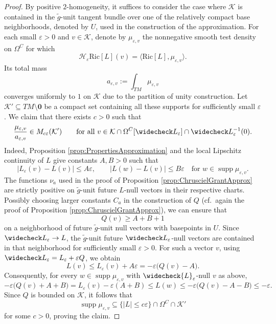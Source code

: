 \documentclass[a4paper,11pt]{article}
\numberwithin{equation}{section}
\theoremstyle{definition}
\theoremstyle{plain}
\newcommand{\eps}{\varepsilon}
\newcommand{\Ric}{\mathrm{Ric}}
\begin{document}
\begin{proof}
By positive $2$-homogeneity, it suffices to consider the case where $\mathcal K$ is contained in the $\tilde g$-unit tangent bundle over one of the relatively compact base neighborhoods, denoted by $U$, used in the construction of the approximation. 
For each small $\varepsilon>0$ and $v\in \mathcal K$, denote by $\mu_{\varepsilon,v}$ the nonnegative smooth test density on $\Omega^C$ for which
\[
    \mathcal H_\eps\Ric[L](v)
    =
    \langle\Ric[L],\mu_{\varepsilon,v}\rangle.
\]
Its total mass
\[
    a_{\varepsilon,v}:=\int_{TM}\mu_{\varepsilon,v}
\]
converges uniformly to $1$ on $\mathcal K$ due to the partition of unity construction.
Let $\mathcal K'\subseteq TM\setminus \mathbf 0$ be a compact set containing all these supports for sufficiently small $\varepsilon$.
We claim that there exists $c>0$ such that
\begin{equation*}
    \frac{\mu_{\varepsilon,v}}{a_{\varepsilon,v}}
    \in M_{c\varepsilon}(\mathcal K')
    \qquad
    \text{for all }v\in \mathcal{K} \cap\Omega^C[\widecheck L_\varepsilon] \cap \widecheck L_\eps^{-1}(0).
\end{equation*}
Indeed, Proposition \ref{prop:PropertiesApproximation} and the local Lipschitz continuity of $L$ give constants $A,B>0$ such that
\[
    |L_\varepsilon(v)-L(v)|\leq A\varepsilon,
    \qquad
    |L(w)-L(v)|\leq B\varepsilon
    \quad\text{for }w\in\operatorname{supp}\mu_{\varepsilon,v}.
\]
The functions $\nu_a$ used in the proof of Proposition \ref{prop:ChruscielGrantApprox} are strictly positive on $\tilde g$-unit future $L$-null vectors in their respective charts.
Possibly choosing larger constants $C_a$ in the construction of $Q$ (cf.\ again the proof of Proposition \ref{prop:ChruscielGrantApprox}), we can ensure that
\[
    Q(v)\geq A+B+1
\]
on a neighborhood of future $\tilde g$-unit null vectors with basepoints in $U$.
Since $\widecheck L_\varepsilon\to L$, the $\tilde g$-unit future $\widecheck L_\varepsilon$-null vectors are contained in that neighborhood for sufficiently small $\varepsilon > 0$. 
For such a vector $v$, using $\widecheck L_\varepsilon=L_\varepsilon+\varepsilon Q$, we obtain
\[
    L(v)
    \leq L_\varepsilon(v)+A\varepsilon
    =-\varepsilon\bigl(Q(v)-A\bigr).
\]
Consequently, for every $w\in\operatorname{supp}\mu_{\varepsilon,v}$ with $\widecheck{L}_\eps$-null $v$ as above,
\[
    -\varepsilon\bigl(Q(v)+A+B\bigr)
    =L_\eps(v) -\eps(A+B)
    \leq L(w)
    \leq-\varepsilon\bigl(Q(v)-A-B\bigr)
    \leq-\varepsilon.
\]
Since $Q$ is bounded on $\mathcal K$, it follows that
\[
    \operatorname{supp}\mu_{\varepsilon,v}
    \subseteq
    \{|L|\leq c\varepsilon\}\cap\Omega^C\cap \mathcal K'
\]
for some $c>0$, proving the claim.


\end{proof}
\end{document}
